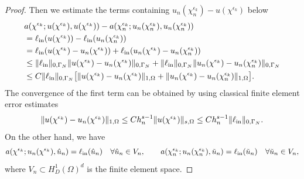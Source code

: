 \documentclass{amsart}
\begin{document}
\begin{proof}
Then we estimate the terms containing \(u_n(\chi_n^{\epsilon_k}) - u(\chi^{\epsilon_k})\) below
    \begin{align*}
        &a(\chi^{\epsilon_k};u(\chi^{\epsilon_k}),u(\chi^{\epsilon_k}))-a(\chi_n^{\epsilon_k};u_n(\chi_n^{\epsilon_k}),u_n(\chi_n^{\epsilon_k}))\nonumber\\
        &=\ell_{\rm in}(u(\chi^{\epsilon_k}))-\ell_{\rm in}(u_n(\chi_n^{\epsilon_k}))\\
        &=\ell_{\rm in}(u(\chi^{\epsilon_k})-u_n(\chi^{\epsilon_k}))+\ell_{\rm in}(u_n(\chi^{\epsilon_k})-u_n(\chi_n^{\epsilon_k}))\\
        &\leq \|\ell_{\rm in}\|_{0,\Gamma_N}\|u(\chi^{\epsilon_k})-u_n(\chi^{\epsilon_k})\|_{0,\Gamma_N}+\|\ell_{\rm in}\|_{0,\Gamma_N}\|u_n(\chi^{\epsilon_k})-u_n(\chi_n^{\epsilon_k})\|_{0,\Gamma_N}\\
        &\leq C\|\ell_{\rm in}\|_{0,\Gamma_N}\big [\|u(\chi^{\epsilon_k})-u_n(\chi^{\epsilon_k})\|_{1,\Omega}+\|u_n(\chi^{\epsilon_k})-u_n(\chi_n^{\epsilon_k})\|_{1,\Omega}\big ].
    \end{align*}
    The convergence of the first term can be obtained by using classical finite element error estimates
    $$\|u(\chi^{\epsilon_k})-u_n(\chi^{\epsilon_k})\|_{1,\Omega}\leq Ch_n^{s-1}\|u(\chi^{\epsilon_k})\|_{s,\Omega}\leq Ch_n^{s-1}\|\ell_{\rm in}\|_{0,\Gamma_N}.$$
    On the other hand, we have
    \begin{align*}
        a(\chi^{\epsilon_k};u_n(\chi^{\epsilon_k}),\hat{u}_n)=\ell_{\rm in}(\hat{u}_n)\quad \forall \hat{u}_n\in V_n,\qquad
        a(\chi_n^{\epsilon_k};u_n(\chi_n^{\epsilon_k}),\tilde{u}_n)=\ell_{\rm in}(\tilde{u}_n)\quad \forall\tilde{u}_n\in  V_n,
    \end{align*}
    where $V_n\subset H_D^1(\Omega)^d$ is the finite element space.
    

\end{proof}
\end{document}
